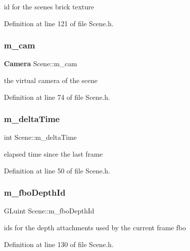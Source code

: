 id for the scene\textquotesingle{}s brick texture 



Definition at line 121 of file Scene.\+h.

\mbox{\label{class_scene_a20b9149e7bf4cca143cb6ec10b9e5e6c}} 
\subsubsection{m\_cam}
{\footnotesize\ttfamily \textbf{ Camera} Scene\+::m\+\_\+cam\hspace{0.3cm}{\ttfamily [private]}}



the virtual camera of the scene 



Definition at line 74 of file Scene.\+h.

\mbox{\label{class_scene_a989db66b95ac58d99e56633fae15747e}} 
\subsubsection{m\_deltaTime}
{\footnotesize\ttfamily int Scene\+::m\+\_\+delta\+Time\hspace{0.3cm}{\ttfamily [private]}}



elapsed time since the last frame 



Definition at line 50 of file Scene.\+h.

\mbox{\label{class_scene_ade6eac31a2459bb2ec3141aff8cbcc85}} 
\subsubsection{m\_fboDepthId}
{\footnotesize\ttfamily G\+Luint Scene\+::m\+\_\+fbo\+Depth\+Id\hspace{0.3cm}{\ttfamily [private]}}



ids for the depth attachments used by the current frame fbo 



Definition at line 130 of file Scene.\+h.

\mbox{\label{class_scene_ab7cbfa0dc91be7d39b2302ecf87df8ef}} 
